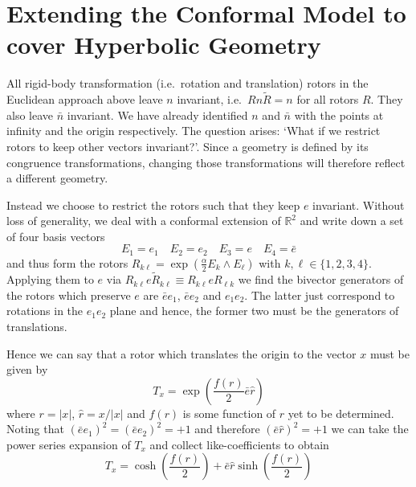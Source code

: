 
\section{Extending the Conformal Model to cover Hyperbolic Geometry}

%
%

All rigid-body transformation (i.e.\ rotation and translation) rotors in 
the Euclidean approach above leave $n$ invariant, i.e.\ 
$Rn\tilde{R} = n$ for all rotors $R$. They also leave $\bar{n}$ invariant. We have
already identified $n$ and $\bar{n}$ with the points at infinity and the origin 
respectively. The question arises: `What if we restrict rotors to keep other
vectors invariant?'. Since a geometry is defined by its congruence transformations,
changing those transformations will therefore reflect a different geometry.

Instead we choose to restrict the rotors such that they keep $e$
invariant. Without loss of generality, we deal with a conformal extension of
$\mathbb{R}^2$ and write down a set of four basis vectors
\begin{equation}
E_1 = e_1 \quad E_2 = e_2 \quad E_3 = e \quad E_4 = \bar{e}
\end{equation}
and thus form the rotors $R_{k\ell } = \exp\left(\frac{\alpha}{2}E_k \wedge E_\ell\right)$ with $k,\ell \in \{1,2,3,4\}$.
Applying them to $e$ via $R_{k\ell }e\tilde{R}_{k\ell } \equiv R_{k\ell }eR_{\ell k}$ we find
the bivector generators of the rotors which preserve $e$ are $\bar{e}e_1$, 
$\bar{e}e_2$ and $e_1e_2$. The latter just correspond to rotations in the
$e_1e_2$ plane and hence, the former two must be the generators of
translations.

Hence we can say that a rotor which translates the origin to the vector
$x$ must be given by
\begin{equation}
T_x = \exp\left(\frac{f(r)}{2}\bar{e}\hat{r}\right)
\end{equation}
where $r = |x|$, $\hat{r} = x/|x|$ and $f(r)$ is some function of $r$ yet to
be determined. Noting that $(\bar{e}{e_1})^2 = (\bar{e}e_2)^2 = +1$ and therefore
$(\bar{e}\hat{r})^2 = +1$ we can take the power series expansion of $T_x$ and
collect like-coefficients to obtain
\begin{equation}
T_x = \cosh\left(\frac{f(r)}{2}\right) + \bar{e}\hat{r}\sinh\left(\frac{f(r)}{2}\right)
\label{eqn:nonEuclidTrans1}
\end{equation}

